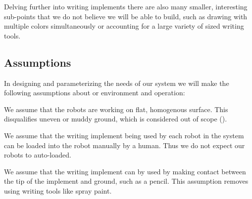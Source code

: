 Delving further into writing implements there are also many smaller, interesting sub-points that we do not believe we will be able to build, such as drawing with multiple colors simultaneously or accounting for a large variety of sized writing tools. 

\subsection{Assumptions}
\label{sec:assumptions}

In designing and parameterizing the needs of our system we will make the following assumptions about or environment and operation: 
\begin{list}{A:~}{}
\item {} 
\item {}  
\item We assume that the robots are working on flat, homogenous surface. This disqualifies uneven or muddy ground, which is considered out of scope ().
\item We assume that the writing implement being used by each robot in the system can be loaded into the robot manually by a human. Thus we do not expect our robots to auto-loaded. 
\item We assume that the writing implement can by used by making contact between the tip of the implement and ground, such as a pencil. This assumption removes using writing tools like spray paint.
\end{list}